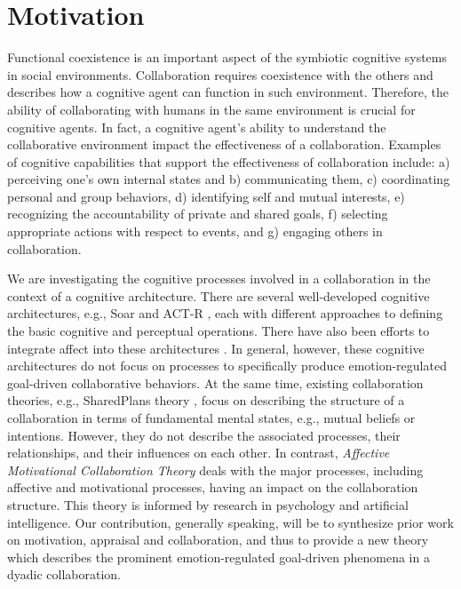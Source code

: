 \documentclass[letterpaper]{article}
\begin{document}
\section{Motivation}

Functional coexistence is an important aspect of the symbiotic cognitive
systems in social environments. Collaboration requires coexistence with
the others and describes how a cognitive agent can function in such environment.
Therefore, the ability of collaborating with humans in the same environment is
crucial for cognitive agents. In fact, a cognitive agent's ability to understand
the collaborative environment impact the effectiveness of a collaboration.
Examples of cognitive capabilities that support the effectiveness of
collaboration include: a) perceiving one's own internal states and b)
communicating them, c) coordinating personal and group behaviors, d) identifying
self and mutual interests, e) recognizing the accountability of private and
shared goals, f) selecting appropriate actions with respect to events, and g)
engaging others in collaboration.

We are investigating the cognitive processes involved in a collaboration in the
context of a cognitive architecture. There are several well-developed cognitive
architectures, e.g., Soar \cite{laird:soar} and ACT-R \cite{anderson:act-r},
each with different approaches to defining the basic cognitive and perceptual
operations. There have also been efforts to integrate affect into these
architectures \cite{dancy:actR-physiology-affect,marinier:behavior-emotion}. In
general, however, these cognitive architectures do not focus on processes to
specifically produce emotion-regulated goal-driven collaborative behaviors. At
the same time, existing collaboration theories, e.g., SharedPlans theory
\cite{grosz:plans-discourse}, focus on describing the structure of a
collaboration in terms of fundamental mental states, e.g., mutual beliefs or
intentions. However, they do not describe the associated processes, their
relationships, and their influences on each other. In contrast,
\textit{Affective Motivational Collaboration Theory} deals with the major
processes, including affective and motivational processes, having an impact on
the collaboration structure. This theory is informed by research in psychology
and artificial intelligence. Our contribution, generally speaking, will be to
synthesize prior work on motivation, appraisal and collaboration, and thus to
provide a new theory which describes the prominent emotion-regulated goal-driven
phenomena in a dyadic collaboration.
\end{document}
